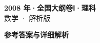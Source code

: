 \documentclass[zihao=-4, a4paper]{ctexart}
\begin{document}
\begin{center}
  {\Large\bfseries 2008 年·全国大纲卷Ⅰ·理科}\\[4pt]
  {\large 数学 · 解析版}
\end{center}
\medskip
{}

\clearpage
{}
\begin{center}{\Large\bfseries 参考答案与详细解析}\end{center}
\medskip

\end{document}

